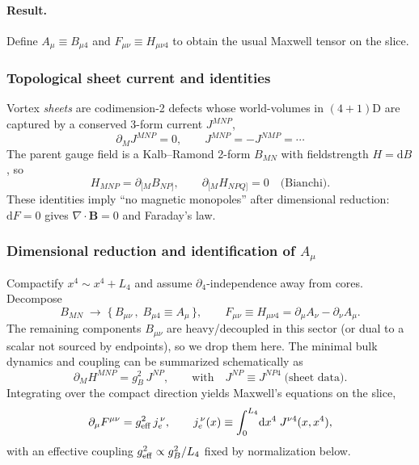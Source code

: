 \paragraph*{Result.} Define $A_\mu\equiv B_{\mu 4}$ and $F_{\mu\nu}\equiv H_{\mu\nu 4}$ to obtain the usual Maxwell tensor on the slice.

\subsubsection{Topological sheet current and identities}
Vortex \emph{sheets} are codimension-2 defects whose world-volumes in $(4{+}1)$D are captured by a conserved 3-form current $J^{MNP}$,
\begin{equation}
\partial_M J^{MNP}=0,
\qquad
J^{MNP}=-J^{NMP}=\cdots
\end{equation}
The parent gauge field is a Kalb--Ramond 2-form $B_{MN}$ with fieldstrength $H=\mathrm d B$, so
\begin{equation}
H_{MNP}=\partial_{[M}B_{NP]},
\qquad
\partial_{[M}H_{NPQ]}=0\quad\text{(Bianchi)}.
\end{equation}
These identities imply ``no magnetic monopoles'' after dimensional reduction: $\mathrm d F=0$ gives $\nabla\!\cdot\!\mathbf B=0$ and Faraday's law.

\subsubsection{Dimensional reduction and identification of $A_\mu$}
Compactify $x^4\sim x^4+L_4$ and assume $\partial_4$-independence away from cores. Decompose
\begin{equation}
B_{MN}\;\longrightarrow\;\{\,B_{\mu\nu}\,,\;B_{\mu 4}\equiv A_\mu\,\},
\qquad
F_{\mu\nu}\equiv H_{\mu\nu 4}
=\partial_\mu A_\nu-\partial_\nu A_\mu.
\end{equation}
The remaining components $B_{\mu\nu}$ are heavy/decoupled in this sector (or dual to a scalar not sourced by endpoints), so we drop them here. The minimal bulk dynamics and coupling can be summarized schematically as
\begin{equation}
\partial_M H^{MNP}=g_B^{2}\,J^{NP},\qquad \text{with}\quad J^{NP}\equiv J^{NP4} \;\text{(sheet data)}.
\end{equation}
Integrating over the compact direction yields Maxwell's equations on the slice,
\begin{equation}
\partial_\mu F^{\mu\nu}=g_{\rm eff}^2\, j_e^{\,\nu},
\qquad
j_e^{\,\nu}(x)\equiv \int_0^{L_4}\!\mathrm d x^4\; J^{\nu 4}(x,x^4),
\label{eq:maxwell-from-sheets}
\end{equation}
with an effective coupling $g_{\rm eff}^2\propto g_B^2/L_4$ fixed by normalization below.

